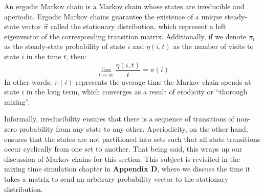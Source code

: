 \begin{definition}
An ergodic Markov chain is a Markov chain whose states are irreducible and aperiodic.
Ergodic Markov chains guarantee the existence of a unique steady-state vector $\vec{\pi}$ called the stationary distribution, which represent a left eigenvector of the corresponding transition matrix.
Additionally, if we denote $\pi_i$ as the steady-state probability of state $i$ and $\eta(i,t)$ as the number of visits to state $i$ in the time $t$, then:
$$\lim_{t \to \infty} \frac{\eta(i,t)}{t} = \pi(i)$$
In other words, $\pi(i)$ represents the average time the Markov chain spends at state $i$ in the long term, which converges as a result of erodicity or ``thorough mixing''.

\end{definition}

Informally, irreducibility ensures that there is a sequence of transitions of non-zero probability from any state to any other.
Aperiodicity, on the other hand, ensures that the states are not partitioned into sets such that all state transitions occur cyclically from one set to another.
That being said, this wraps up our discussion of Markov chains for this section.
This subject is revisited in the mixing time simulation chapter in \textbf{Appendix D}, where we discuss the time it takes a matrix to send an arbitrary probability vector to the stationary distribution.


